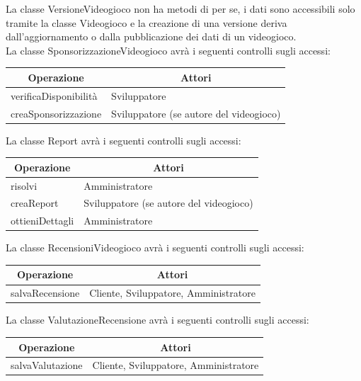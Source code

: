 La classe VersioneVideogioco non ha metodi di per se, i dati sono accessibili solo tramite la classe Videogioco e la creazione di una versione deriva dall’aggiornamento o dalla pubblicazione dei dati di un videogioco.\\
La classe SponsorizzazioneVideogioco avrà i seguenti controlli sugli accessi:
\begin{center}
	\begin{tabular}{||l | p{20em}||} 
	\hline
	\multicolumn{1}{||c|}{\textbf{Operazione}} & \multicolumn{1}{c||}{\textbf{Attori}} \\
	\hline\hline
	verificaDisponibilità & Sviluppatore \\ 
	\hline
	creaSponsorizzazione & Sviluppatore (se autore del videogioco) \\
	\hline
   \end{tabular}
\end{center}

\newpage
La classe Report avrà i seguenti controlli sugli accessi:
\begin{center}
	\begin{tabular}{||l | p{23.5em}||} 
	\hline
	\multicolumn{1}{||c|}{\textbf{Operazione}} & \multicolumn{1}{c||}{\textbf{Attori}} \\
	\hline\hline
	risolvi & Amministratore \\ 
	\hline
	creaReport & Sviluppatore (se autore del videogioco) \\
	\hline
	ottieniDettagli & Amministratore \\
	\hline
   \end{tabular}
\end{center}

La classe RecensioniVideogioco avrà i seguenti controlli sugli accessi:
\begin{center}
	\begin{tabular}{||l | p{23em}||} 
	\hline
	\multicolumn{1}{||c|}{\textbf{Operazione}} & \multicolumn{1}{c||}{\textbf{Attori}} \\
	\hline\hline
	salvaRecensione & Cliente, Sviluppatore, Amministratore \\ 
	\hline
   \end{tabular}
\end{center}

La classe ValutazioneRecensione avrà i seguenti controlli sugli accessi:
\begin{center}
	\begin{tabular}{||l | p{23em}||} 
	\hline
	\multicolumn{1}{||c|}{\textbf{Operazione}} & \multicolumn{1}{c||}{\textbf{Attori}} \\
	\hline\hline
	salvaValutazione & Cliente, Sviluppatore, Amministratore \\ 
	\hline
   \end{tabular}
\end{center}

